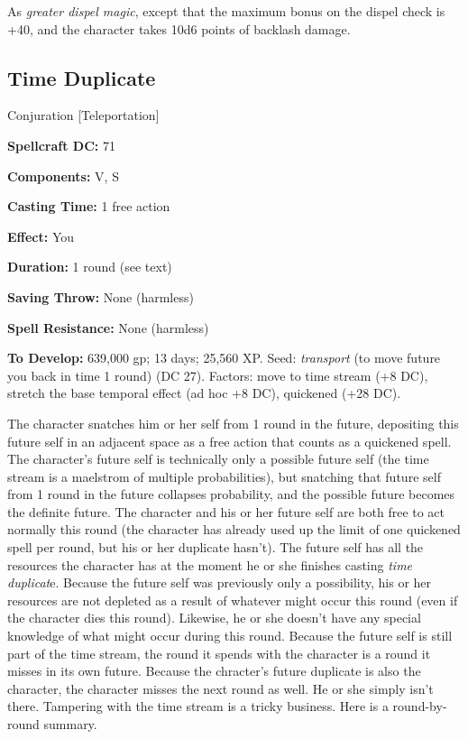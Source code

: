 \documentclass{article}
\begin{document}
As \textit{greater dispel magic}, except that the maximum bonus on the dispel check 
is +40, and the character takes 10d6 points of backlash damage. 

\vspace{12pt}
\subsection*{Time Duplicate }

Conjuration [Teleportation] 

\textbf{Spellcraft DC:} 71 

\textbf{Components:} V, S 

\textbf{Casting Time:} 1 free action 

\textbf{Effect:} You 

\textbf{Duration:} 1 round (see text) 

\textbf{Saving Throw:} None (harmless) 

\textbf{Spell Resistance:} None (harmless) 

\textbf{To Develop:} 639,000 gp; 13 days; 25,560 XP. Seed: \textit{transport }(to 
move future you back in time 1 round) (DC 27). Factors: move to time stream (+8 
DC), stretch the base temporal effect (ad hoc +8 DC), quickened (+28 DC). 

The character snatches him or her self from 1 round in the future, depositing this 
future self in an adjacent space as a free action that counts as a quickened spell. 
The character's future self is technically only a possible future self (the time 
stream is a maelstrom of multiple probabilities), but snatching that future self 
from 1 round in the future collapses probability, and the possible future becomes 
the definite future. The character and his or her future self are both free to 
act normally this round (the character has already used up the limit of one quickened 
spell per round, but his or her duplicate hasn't). The future self has all the 
resources the character has at the moment he or she finishes casting \textit{time 
duplicat}e. Because the future self was previously only a possibility, his or her 
resources are not depleted as a result of whatever might occur this round (even 
if the character dies this round). Likewise, he or she doesn't have any special 
knowledge of what might occur during this round. Because the future self is still 
part of the time stream, the round it spends with the character is a round it misses 
in its own future. Because the chracter's future duplicate is also the character, 
the character misses the next round as well. He or she simply isn't there. Tampering 
with the time stream is a tricky business. Here is a round-by-round summary. 
\end{document}
